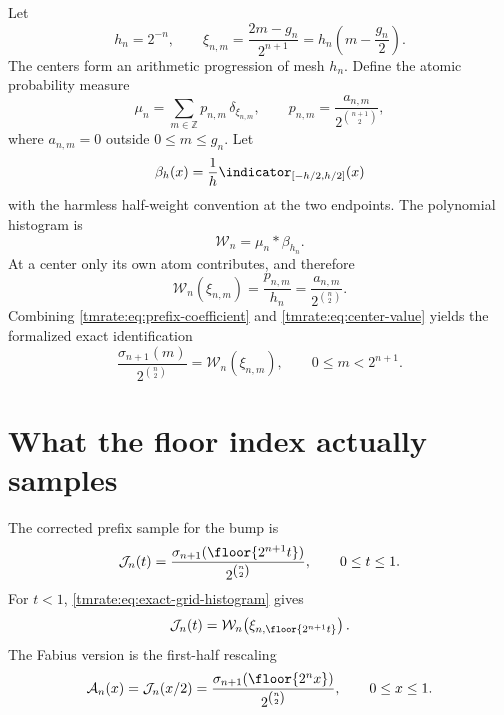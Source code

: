 \documentclass[11pt,oneside]{article}
\theoremstyle{definition}
\theoremstyle{remark}
\newcommand{\Z}{\mathbb Z}
\begin{document}
Let
\begin{equation}
 h_n=2^{-n},
 \qquad
 \xi_{n,m}=\frac{2m-g_n}{2^{n+1}}
          =h_n\left(m-\frac{g_n}{2}\right).                \label{tmrate:eq:centers}
\end{equation}
The centers form an arithmetic progression of mesh $h_n$.  Define the atomic
probability measure
\begin{equation}
 \mu_n=\sum_{m\in\Z}p_{n,m}\,\delta_{\xi_{n,m}},
 \qquad
 p_{n,m}=\frac{a_{n,m}}{2^{\binom{n+1}{2}}},               \label{tmrate:eq:mu-n}
\end{equation}
where $a_{n,m}=0$ outside $0\le m\le g_n$.  Let
\begin{equation}
 \beta_h(x)=\frac1h\indicator_{[-h/2,h/2]}(x)              \label{tmrate:eq:box-density}
\end{equation}
with the harmless half-weight convention at the two endpoints.  The polynomial
histogram is
\begin{equation}
 \mathcal W_n=\mu_n*\beta_{h_n}.                            \label{tmrate:eq:histogram-convolution}
\end{equation}
At a center only its own atom contributes, and therefore
\begin{equation}
 \mathcal W_n(\xi_{n,m})
 =\frac{p_{n,m}}{h_n}
 =\frac{a_{n,m}}{2^{\binom n2}}.                           \label{tmrate:eq:center-value}
\end{equation}
Combining \eqref{tmrate:eq:prefix-coefficient} and \eqref{tmrate:eq:center-value} yields the
formalized exact identification
\begin{equation}
 \frac{\sigma_{n+1}(m)}{2^{\binom n2}}
 =\mathcal W_n(\xi_{n,m}),
 \qquad 0\le m<2^{n+1}.                                   \label{tmrate:eq:exact-grid-histogram}
\end{equation}

\section{What the floor index actually samples}
\label{tmrate:sec:centering}

The corrected prefix sample for the bump is
\begin{equation}
 \mathcal J_n(t)=
 \frac{\sigma_{n+1}(\floor{2^{n+1}t})}{2^{\binom n2}},
 \qquad 0\le t\le1.                                      \label{tmrate:eq:J-def}
\end{equation}
For $t<1$, \eqref{tmrate:eq:exact-grid-histogram} gives
\begin{equation}
 \mathcal J_n(t)=
 \mathcal W_n\!\left(\xi_{n,\floor{2^{n+1}t}}\right).    \label{tmrate:eq:J-histogram}
\end{equation}
The Fabius version is the first-half rescaling
\begin{equation}
 \mathcal A_n(x)=\mathcal J_n(x/2)
 =\frac{\sigma_{n+1}(\floor{2^n x})}{2^{\binom n2}},
 \qquad 0\le x\le1.                                     \label{tmrate:eq:A-def}
\end{equation}
\end{document}
